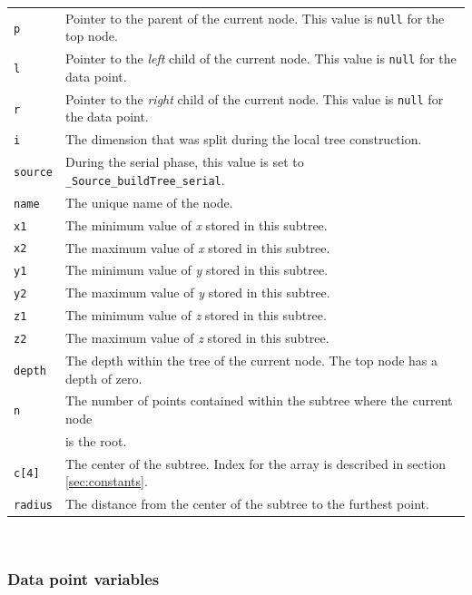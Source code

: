 \documentclass{article}
\begin{document}
\begin{tabular}{l l}
\texttt{p} & Pointer to the parent of the current node. This value is \texttt{null} for the top node. \\
\texttt{l} & Pointer to the \textit{left} child of the current node. This value is \texttt{null} for the data point. \\
\texttt{r} & Pointer to the \textit{right} child of the current node. This value is \texttt{null} for the data point. \\
\texttt{i} & The dimension that was split during the local tree construction. \\
\texttt{source} & During the serial phase, this value is set to \texttt{\_Source\_buildTree\_serial}. \\
\texttt{name} & The unique name of the node. \\
\texttt{x1} & The minimum value of \textit{x} stored in this subtree. \\
\texttt{x2} & The maximum value of \textit{x} stored in this subtree. \\
\texttt{y1} & The minimum value of \textit{y} stored in this subtree. \\
\texttt{y2} & The maximum value of \textit{y} stored in this subtree. \\
\texttt{z1} & The minimum value of \textit{z} stored in this subtree. \\
\texttt{z2} & The maximum value of \textit{z} stored in this subtree. \\
\texttt{depth} & The depth within the tree of the current node. The top node has a depth of zero. \\
\texttt{n} & The number of points contained within the subtree where the current node \\
& is the root. \\
\texttt{c[4]} & The center of the subtree. Index for the array is described in section \ref{sec:constants}. \\
\texttt{radius} & The distance from the center of the subtree to the furthest point. \\
\end{tabular} \\


%
%

\subsubsection{Data point variables}
\end{document}
